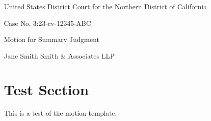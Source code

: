 \documentclass[12pt,letterpaper]{article}
\begin{document}
\begin{center}
United States District Court for the Northern District of California

Case No. 3:23-cv-12345-ABC

Motion for Summary Judgment

Jane Smith
Smith & Associates LLP
\end{center}

\section{Test Section}

This is a test of the motion template.
\end{document}

